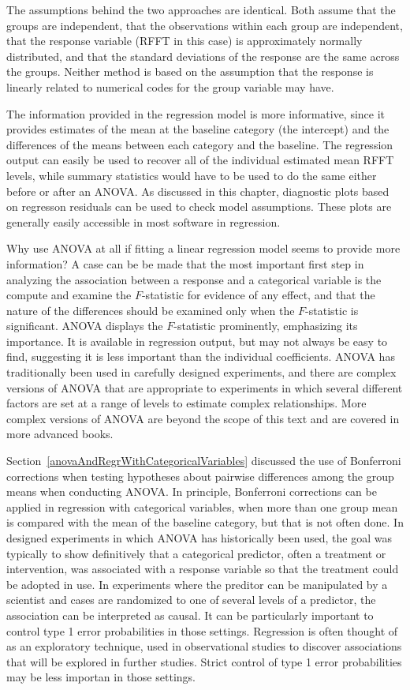 The assumptions behind the two approaches are identical.  Both assume that the groups are independent, that the observations within each group are independent, that the response variable (RFFT in this case) is approximately normally distributed, and that the standard deviations of the response are the same across the groups.  Neither method is based on the assumption that the response is linearly related to numerical codes for the group variable may have.

The information provided in the regression model is more informative, since it provides estimates of the mean at the baseline category (the intercept) and the differences of the means between each category and the baseline.  The regression output can easily be used to recover all of the individual estimated mean RFFT levels, while summary statistics would have to be used to do the same either before or after an ANOVA.  As discussed in this chapter, diagnostic plots based on regresson residuals can be used to check model assumptions. These plots are generally easily accessible in most software in regression.  

Why use ANOVA at all if fitting a linear regression model seems to provide more information?  A case can be be made that the most important first step in analyzing the association between a response and a categorical variable is the compute and examine the $F$-statistic for evidence of any effect, and that the nature of the differences should be examined only when the $F$-statistic is significant.  ANOVA displays the $F$-statistic prominently, emphasizing its importance. It is available in regression output, but may not always be easy to find, suggesting it is less important than the individual coefficients.  ANOVA has traditionally been used in carefully designed experiments, and there are complex versions of ANOVA that are appropriate to experiments in which several different factors are set at a range of levels to estimate complex relationships.  More complex versions of ANOVA are beyond the scope of this text and are covered in more advanced books.

Section~\ref{anovaAndRegrWithCategoricalVariables} discussed the use of Bonferroni corrections when testing hypotheses about pairwise differences among the group means when conducting ANOVA. In principle, Bonferroni corrections can be applied in regression with categorical variables, when more than one group mean is compared with the mean of the baseline category, but that is not often done. In designed experiments in which ANOVA has historically been used, the goal was typically to show definitively that a categorical predictor, often a treatment or intervention, was associated with a response variable so that the treatment could be adopted in use. In experiments where the preditor can be manipulated by a scientist and cases are randomized to one of several levels of a predictor, the association can be interpreted as causal.  It can be particularly important to control type 1 error probabilities in those settings.  Regression is often thought of as an exploratory technique, used in observational studies to discover associations that will be explored in further studies.  Strict control of type 1 error probabilities may be less importan in those settings.

